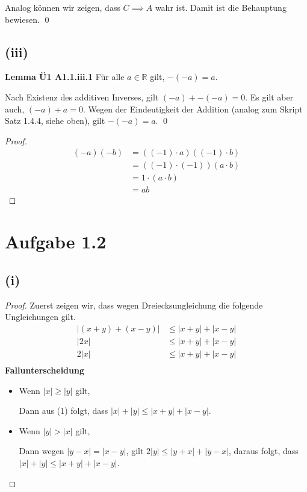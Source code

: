 \documentclass[12pt]{extarticle}
\begin{document}
Analog können wir zeigen, dass \(C \implies A\) wahr ist.  Damit ist die
Behauptung bewiesen. \qed

\subsection*{(iii)}
\textbf{Lemma Ü1 A1.1.iii.1} Für alle \(a \in \mathbb{R}\) gilt, $-(-a)
= a$.

Nach Existenz des additiven Inverses, gilt \((-a) + -(-a) = 0\).  Es
gilt aber auch, \((-a) + a =0\).  Wegen der Eindeutigkeit der Addition
(analog zum Skript Satz 1.4.4, siehe oben), gilt \(-(-a) = a\). \qed
\begin{proof}
\begin{align*}
  (-a)(-b) &= ((-1) \cdot a)((-1) \cdot b) \tag*{Lemma Ü1 A1.1.ii.1}\\
           &= ((-1) \cdot (-1)) (a \cdot b) \tag*{M1, M2}\\
           &= 1 \cdot (a \cdot b) \tag*{Lemma Ü1 A1.1.iii.1} \\
  &= ab \tag*{M3}
\end{align*}
  \end{proof}

\section*{Aufgabe 1.2}
\subsection*{(i)}
\begin{proof}
Zuerst zeigen wir, dass wegen Dreiecksungleichung die folgende
Ungleichungen gilt.
\begin{align*}
\left| (x+y) + (x-y) \right| &\leq \left| x+y \right| + \left| x - y
                               \right| \tag*{Dreiecksungleichung}\\
  \left| 2x \right| &\leq \left| x+y \right| + \left| x - y \right|\\
  2\left|  x \right| &\leq \left| x+y \right| + \left| x - y \right| \tag{1}\\
\end{align*}
\textbf{Fallunterscheidung}
\begin{itemize}
\item Wenn \(\left| x \right| \geq \left| y \right|\) gilt,

  Dann aus (1) folgt, dass $\left| x \right| + \left| y \right| \leq
  \left| x+y \right| + \left| x - y \right|$.

\item Wenn \(\left| y \right| > \left| x \right|\) gilt,

  Dann wegen \(\left| y-x \right| = \left| x-y \right|\), gilt $2 \left|
    y \right| \leq \left| y+x \right| + \left| y-x \right|$, daraus
  folgt, dass $\left| x \right| + \left| y \right| \leq
  \left| x+y \right| + \left| x - y \right|$.
\end{itemize}
\end{proof}
\end{document}
